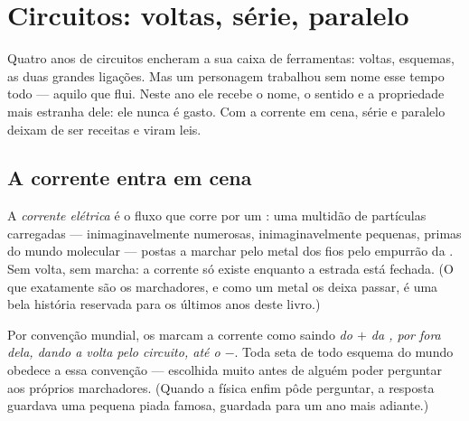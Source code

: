 \chapter{Circuitos: voltas, série, paralelo}\label{ch:g7:circuits-series-parallel}

Quatro anos de circuitos encheram a sua caixa de ferramentas: voltas,
esquemas, as duas grandes ligações. Mas um personagem trabalhou sem
nome esse tempo todo --- aquilo que flui. Neste ano ele recebe o
nome, o sentido e a propriedade mais estranha dele: ele nunca é
gasto. Com a corrente em cena, série e paralelo deixam de ser receitas
e viram leis.

\section{A corrente entra em cena}

\begin{definition}\label{def:g7:circuits-series-parallel:current}
A \emph{corrente elétrica} é o fluxo que
corre por um : uma multidão de partículas carregadas
--- inimaginavelmente numerosas, inimaginavelmente pequenas, primas
do mundo molecular --- postas a marchar pelo metal dos fios pelo
empurrão da . Sem volta, sem marcha: a corrente só existe
enquanto a estrada está fechada. (O que exatamente são os
marchadores, e como um metal os deixa passar, é uma bela história
reservada para os últimos anos deste livro.)
\end{definition}

\begin{proposition}\label{prop:g7:circuits-series-parallel:direction}
Por convenção mundial, os  marcam a corrente como
saindo \emph{do  $+$ da , por fora dela, dando a volta
pelo circuito, até o  $-$}. Toda seta de todo esquema do
mundo obedece a essa convenção --- escolhida muito antes de alguém
poder perguntar aos próprios marchadores. (Quando a física enfim pôde
perguntar, a resposta guardava uma pequena piada famosa, guardada
para um ano mais adiante.)
\end{proposition}

